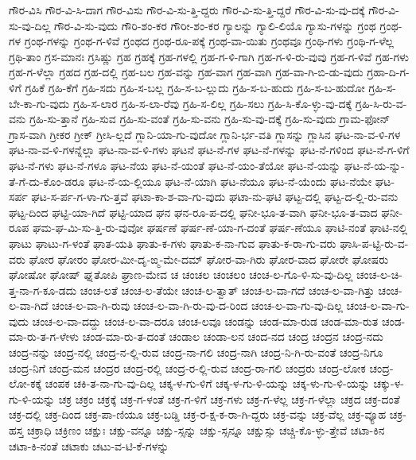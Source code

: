 {ಗೌರ-ವಿಸಿ
ಗೌರ-ವಿ-ಸಿ-ದಾಗ
ಗೌರ-ವಿಸು
ಗೌರ-ವಿ-ಸು-ತ್ತಿ-ದ್ದರು
ಗೌರ-ವಿ-ಸು-ತ್ತಿ-ದ್ದರೆ
ಗೌರ-ವಿ-ಸು-ವು-ದಕ್ಕೆ
ಗೌರ-ವಿ-ಸು-ವು-ದಿಲ್ಲ
ಗೌರ-ವಿ-ಸು-ವುದು
ಗೌರಿ-ಶಂ-ಕರ
ಗೌರೀ-ಶಂ-ಕರ
ಗ್ಯಾಲನ್ನು
ಗ್ಯಾಲಿ-ಲಿಯೊ
ಗ್ಯಾಸು-ಗಳನ್ನು
ಗ್ರಂಥ
ಗ್ರಂಥ-ಗಳ
ಗ್ರಂಥ-ಗಳನ್ನು
ಗ್ರಂಥ-ಗ-ಳಿವೆ
ಗ್ರಂಥದ
ಗ್ರಂಥ-ರೂ-ಪಕ್ಕೆ
ಗ್ರಂಥ-ವಾ-ಯಿತು
ಗ್ರಂಥವೂ
ಗ್ರಂಥಿ-ಗಳು
ಗ್ರಂಥಿ-ಗ-ಳೆಲ್ಲ
ಗ್ರಥಿ-ತಾಂ
ಗ್ರಸ-ಮಾನಃ
ಗ್ರಸಿಷ್ಣು
ಗ್ರಹ
ಗ್ರಹಕ್ಕೆ
ಗ್ರಹ-ಗಳಲ್ಲಿ
ಗ್ರಹ-ಗ-ಳಿ-ಗಾಗಿ
ಗ್ರಹ-ಗ-ಳಿ-ರು-ವುವು
ಗ್ರಹ-ಗ-ಳಿವೆ
ಗ್ರಹ-ಗಳು
ಗ್ರಹ-ಗ-ಳೆಲ್ಲಾ
ಗ್ರಹದ
ಗ್ರಹ-ದಲ್ಲಿ
ಗ್ರಹ-ಬಲ
ಗ್ರಹ-ವನ್ನು
ಗ್ರಹ-ವಾಗ
ಗ್ರಹ-ವಾಗಿ
ಗ್ರಹ-ವಾ-ಗಿ-ಬಿ-ಡು-ವುದು
ಗ್ರಹಾ-ದಿ-ಗ-ಳಿಗೆ
ಗ್ರಹಿಕೆ
ಗ್ರಹಿ-ಕೆಗೆ
ಗ್ರಹಿ-ಸದು
ಗ್ರಹಿ-ಸ-ಬಲ್ಲ
ಗ್ರಹಿ-ಸ-ಬ-ಲ್ಲುದು
ಗ್ರಹಿ-ಸ-ಬ-ಹುದು
ಗ್ರಹಿ-ಸ-ಬ-ಹುದೋ
ಗ್ರಹಿ-ಸ-ಬೇ-ಕಾ-ಗು-ವುದು
ಗ್ರಹಿ-ಸ-ಲಾರ
ಗ್ರಹಿ-ಸ-ಲಾ-ರೆವು
ಗ್ರಹಿ-ಸ-ಲಿಲ್ಲ
ಗ್ರಹಿ-ಸಲು
ಗ್ರಹಿ-ಸಿ-ಕೊ-ಳ್ಳು-ವು-ದಕ್ಕೆ
ಗ್ರಹಿ-ಸಿ-ರು-ವ-ವನು
ಗ್ರಹಿ-ಸು-ತ್ತಾನೆ
ಗ್ರಹಿ-ಸುವ
ಗ್ರಹಿ-ಸು-ವಂತೆ
ಗ್ರಹಿ-ಸು-ವನು
ಗ್ರಹಿ-ಸು-ವು-ದಕ್ಕೆ
ಗ್ರಹಿ-ಸು-ವುದು
ಗ್ರಾಮ-ಫೋನ್
ಗ್ರಾಸ-ವಾಗಿ
ಗ್ರೀಕರ
ಗ್ರೀಕ್
ಗ್ರೀಸಿ-ಲ್ಲದೆ
ಗ್ಲಾನಿ-ಯಾ-ಗು-ವುದೋ
ಗ್ಲಾನಿ-ರ್ಭ-ವತಿ
ಗ್ಲಾಸನ್ನು
ಗ್ಲಾಸಿನ
ಘಟ-ನಾ-ವ-ಳಿ-ಗಳ
ಘಟ-ನಾ-ವ-ಳಿ-ಗಳನ್ನೆಲ್ಲಾ
ಘಟ-ನಾ-ವ-ಳಿ-ಗಳು
ಘಟನೆ
ಘಟ-ನೆ-ಗಳ
ಘಟ-ನೆ-ಗಳನ್ನು
ಘಟ-ನೆ-ಗಳಿಂದ
ಘಟ-ನೆ-ಗ-ಳಿಗೆ
ಘಟ-ನೆ-ಗಳು
ಘಟ-ನೆ-ಗಳೂ
ಘಟ-ನೆಯ
ಘಟ-ನೆ-ಯಂತೆ
ಘಟ-ನೆ-ಯಂ-ತೆಯೋ
ಘಟ-ನೆ-ಯನ್ನು
ಘಟ-ನೆ-ಯ-ನ್ನು-ತೆ-ಗೆ-ದು-ಕೊಂ-ಡರೂ
ಘಟ-ನೆ-ಯ-ಲ್ಲಿಯೂ
ಘಟ-ನೆ-ಯಾಗಿ
ಘಟ-ನೆಯೂ
ಘಟ-ನೆ-ಯೆಂದು
ಘಟ-ನೆಯೇ
ಘಟ-ಸರ್ಪ
ಘಟ-ಸ-ರ್ಪ-ಗ-ಳಾ-ಗು-ತ್ತವೆ
ಘಟಾ-ಕಾ-ಶ-ವಾ-ಗು-ವುದು
ಘಟಾ-ನು-ಘಟಿ
ಘಟ್ಟ-ದಲ್ಲಿ
ಘಟ್ಟ-ದ-ಲ್ಲಿ-ರು-ವನು
ಘಟ್ಟ-ದಿಂದ
ಘಟ್ಟಿ-ಯಾ-ಗಿದೆ
ಘಟ್ಟಿ-ಯಾದ
ಘನ
ಘನ-ರೂ-ಪ-ದಲ್ಲಿ
ಘನೀ-ಭೂ-ತ-ವಾಗಿ
ಘನೀ-ಭೂ-ತ-ವಾದ
ಘನೀ-ರೂಪ
ಘಮ-ಘ-ಮಿ-ಸು-ತ್ತಿ-ರು-ವುವೋ
ಘರ್ಷಣೆ
ಘರ್ಷ-ಣೆ-ಯಾ-ಗ-ದಂತೆ
ಘರ್ಷ-ಣೆಯೂ
ಘಾಟಿ-ನಂತೆ
ಘಾಟಿ-ನಲ್ಲಿ
ಘಾಟು
ಘಾಟು-ಗ-ಳಂತೆ
ಘಾತ-ಯತಿ
ಘಾತು-ಕ-ಗಳು
ಘಾತು-ಕ-ನಾ-ಗುವ
ಘಾತು-ಕ-ರಾ-ಗು-ವರು
ಘಾಸಿ-ಪ-ಟ್ಟಿ-ರು-ವ-ವರು
ಘೋರ
ಘೋರಂ
ಘೋರ-ಮೀ-ದೃ-ಙ್ಮ-ಮೇ-ದಮ್
ಘೋರ-ವಾ-ಗಿರು
ಘೋರ-ವಾದ
ಘೋರೇ
ಘೋಷರು
ಘೋಷೋ
ಘೋಷ್
ಘ್ನತೋಪಿ
ಘ್ರಾಣ-ಮೇವ
ಚ
ಚಂಚಲ
ಚಂಚಲಂ
ಚಂಚ-ಲ-ಗೊ-ಳಿ-ಸು-ವು-ದಿಲ್ಲ
ಚಂಚ-ಲ-ಚಿ-ತ್ತ-ನಾ-ಗ-ಕೂ-ಡದು
ಚಂಚ-ಲತೆ
ಚಂಚ-ಲ-ತೆಯೇ
ಚಂಚ-ಲ-ತ್ವಾತ್
ಚಂಚ-ಲ-ವಾ-ಗದೆ
ಚಂಚ-ಲ-ವಾ-ಗಿತ್ತು
ಚಂಚ-ಲ-ವಾ-ಗಿದೆ
ಚಂಚ-ಲ-ವಾ-ಗಿ-ರುವು
ಚಂಚ-ಲ-ವಾ-ಗಿ-ರು-ವು-ದ-ರಿಂದ
ಚಂಚ-ಲ-ವಾ-ಗು-ವು-ದಿಲ್ಲ
ಚಂಚ-ಲ-ವಾ-ಗು-ವುದು
ಚಂಚ-ಲ-ವಾ-ದದ್ದು
ಚಂಚ-ಲ-ವಾ-ದರೂ
ಚಂಚ-ಲವೂ
ಚಂಡನ್ನು
ಚಂಡ-ಮಾ-ರುಡ
ಚಂಡ-ಮಾ-ರುತ
ಚಂಡ-ಮಾ-ರು-ತ-ಗ-ಳೇಳು
ಚಂಡ-ಮಾ-ರು-ತ-ದಂತೆ
ಚಂಡಾಲ
ಚಂಡಾ-ಲನ
ಚಂದ-ನದ
ಚಂದ್ರ
ಚಂದ್ರನ
ಚಂದ್ರ-ನದು
ಚಂದ್ರ-ನನ್ನು
ಚಂದ್ರ-ನಲ್ಲಿ
ಚಂದ್ರ-ನ-ಲ್ಲಿ-ರುವ
ಚಂದ್ರ-ನಾ-ಗಲಿ
ಚಂದ್ರ-ನಾಗಿ
ಚಂದ್ರ-ನಿ-ಗಿ-ರು-ವಂತೆ
ಚಂದ್ರ-ನಿಗೂ
ಚಂದ್ರ-ನಿಗೆ
ಚಂದ್ರ-ಮನ
ಚಂದ್ರರ
ಚಂದ್ರ-ರಲ್ಲಿ
ಚಂದ್ರ-ರ-ಲ್ಲಿ-ರುವ
ಚಂದ್ರ-ರಾ-ಗಲಿ
ಚಂದ್ರರು
ಚಂದ್ರ-ಲೋಕ
ಚಂದ್ರ-ಲೋ-ಕಕ್ಕೆ
ಚಂಪಕ
ಚಕಿ-ತ-ನಾ-ಗು-ವು-ದಿಲ್ಲ
ಚಕ್ಕ-ಳ-ಗು-ಳಿಗೆ
ಚಕ್ಕ-ಳ-ಗು-ಳಿ-ಯನ್ನು
ಚಕ್ಕ-ಳು-ಗು-ಳಿ-ಯನ್ನು
ಚಕ್ಕು-ಳ-ಗು-ಳಿ-ಯನ್ನು
ಚಕ್ರ
ಚಕ್ರಂ
ಚಕ್ರಕ್ಕೆ
ಚಕ್ರ-ಗ-ಳಂತೆ
ಚಕ್ರ-ಗ-ಳಿಗೆ
ಚಕ್ರ-ಗಳು
ಚಕ್ರ-ಗ-ಳೆಲ್ಲ
ಚಕ್ರ-ಗ-ಳೆಲ್ಲಾ
ಚಕ್ರದ
ಚಕ್ರ-ದಂತೆ
ಚಕ್ರ-ದಲ್ಲಿ
ಚಕ್ರ-ದಿಂದ
ಚಕ್ರ-ಪಾ-ಣಿಯೂ
ಚಕ್ರ-ಬಡ್ಡಿ
ಚಕ್ರ-ರ-ಕ್ಷ-ಕ-ರಾ-ಗಿ-ದ್ದರು
ಚಕ್ರ-ವನ್ನು
ಚಕ್ರ-ವೆಲ್ಲ
ಚಕ್ರ-ವ್ಯೂಹ
ಚಕ್ರ-ಹಸ್ತ
ಚಕ್ರಾಧಿ
ಚಕ್ರಿಣಂ
ಚಕ್ಷುಃ
ಚಕ್ಷು-ವನ್ನೂ
ಚಕ್ಷು-ಸ್ಸನ್ನು
ಚಕ್ಷು-ಸ್ಸನ್ನೂ
ಚಕ್ಷುಸ್ಸು
ಚಚ್ಚಿ-ಕೊ-ಳ್ಳು-ತ್ತೇವೆ
ಚಟಾ-ಕಿನ
ಚಟಾ-ಕಿ-ನಂತೆ
ಚಟಾಕು
ಚಟು-ವ-ಟಿ-ಕೆ-ಗಳನ್ನು
}
